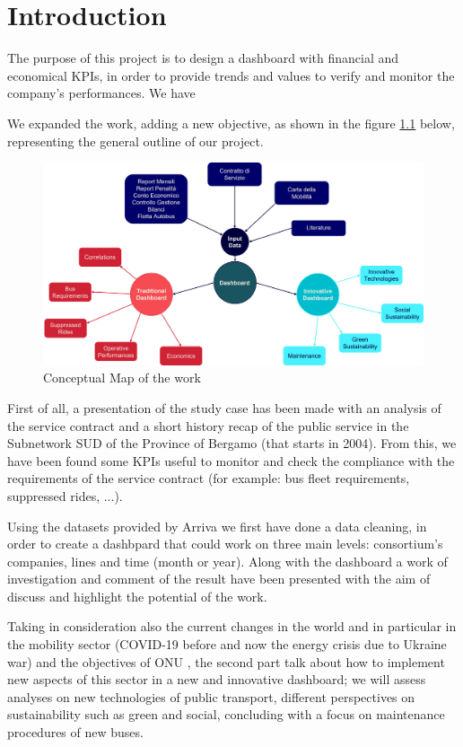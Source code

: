 \chapter{Introduction}
The purpose of this project is to design a dashboard with financial and economical KPIs, in order to provide trends and values to verify and monitor the company's performances. We have 

We expanded the work, adding a new objective, as shown in the figure \ref{fig:concmap} below, representing the general outline of our project.


\begin{figure}[h]
    \centering
    \includegraphics[width=1\textwidth]{Images/intro_scheme.png}
    \caption{Conceptual Map of the work}
    \label{fig:concmap}
\end{figure}

First of all, a presentation of the study case has been made with an analysis of the service
contract and a short history recap of the public service in the Subnetwork SUD of the
Province of Bergamo (that starts in 2004). From this, we have been found some KPIs useful
to monitor and check the compliance with the requirements of the service contract (for
example: bus fleet requirements, suppressed rides, ...).

Using the datasets provided by Arriva we first have done a data cleaning, in order to create a dashbpard that could work on three main levels: consortium's companies, lines and time (month or year). Along with the dashboard a work of investigation and comment of the result have been presented with the aim of discuss and highlight the potential of the work.

Taking in consideration also the current changes in the world and in particular in the mobility sector (COVID-19 before and now the energy crisis due to Ukraine war) and  the objectives of ONU \cite{sdgs}, the second part talk about how to implement new aspects of this sector in a new and innovative dashboard; we will assess analyses on new technologies of public transport, different perspectives on sustainability such as green and social, concluding with a focus on maintenance procedures of new buses.

\date{\today}
















